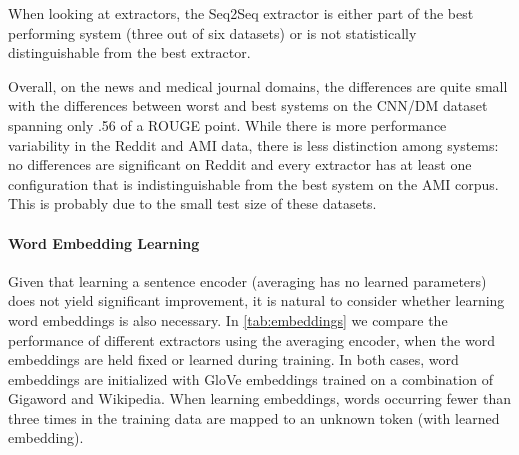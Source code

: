 

When looking at extractors, the Seq2Seq extractor is either part of 
the best performing system (three out of six datasets) or is not 
statistically distinguishable from the best extractor. 

Overall, on the news and medical journal domains, the differences are 
quite small with the 
differences between worst and best systems on the CNN/DM dataset 
spanning only .56 of a ROUGE point. While there is more performance variability
 in the Reddit and AMI data, there is less distinction among systems: 
 no differences are significant on Reddit
and every extractor has at least one configuration that is indistinguishable
from the best system on the AMI corpus. This is probably due to the small test
size of these datasets.










\paragraph{Word Embedding Learning}
 Given that learning a sentence encoder (averaging has no learned parameters)
 does not yield significant improvement, it is natural to consider whether
 learning word embeddings is also necessary. 
 In \autoref{tab:embeddings} we compare the performance of different extractors
 using the averaging encoder, when the word embeddings are held fixed or 
 learned during training. In both cases, word embeddings are initialized with
 GloVe embeddings trained on a combination of Gigaword and Wikipedia.
 When learning embeddings, words occurring 
 fewer than three times in the training data are mapped to an unknown
 token (with learned embedding).
 
